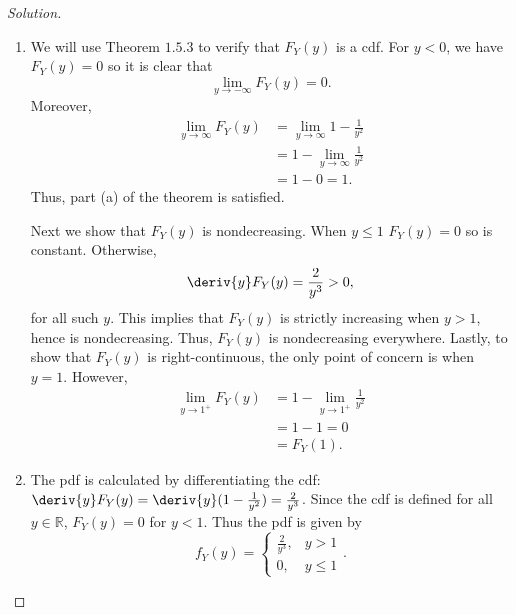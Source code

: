 \documentclass[12pt]{article}
\theoremstyle{definition}
\theoremstyle{plain}
\newenvironment{solution}
  {\begin{proof}[Solution]}
  {\end{proof}}
\begin{document}
\begin{enumerate}
\begin{solution}
\begin{enumerate}
\item We will use Theorem $ 1.5.3 $ to verify that $ F_Y(y) $ is a cdf. For $ y < 0 $, we have $ F_Y(y) = 0 $ so it is clear that 
\[ \lim_{y \to -\infty} F_Y(y) = 0. \]
Moreover, 
\begin{align*}
	\lim_{y \to \infty} F_Y(y) &= \lim_{y \to \infty} 1 - \frac{1}{y^2}\\
	&= 1 - \lim_{y \to \infty} \frac{1}{y^2}\\
	&= 1 - 0 = 1.
\end{align*}
Thus, part (a) of the theorem is satisfied. 

Next we show that $ F_Y(y) $ is nondecreasing. When $ y \leq 1 $ $ F_Y(y) = 0$ so is constant. Otherwise, 
\[ \deriv{y} F_Y(y) = \frac{2}{y^3} > 0, \]
for all such $ y $. This implies that $ F_Y(y) $ is strictly increasing when $ y > 1 $, hence is nondecreasing. Thus, $ F_Y(y) $ is nondecreasing everywhere. Lastly, to show that $ F_Y(y) $ is right-continuous, the only point of concern is when $ y = 1 $. However,
\begin{align*}
	\lim_{y \to 1^+} F_Y(y) &= 1 - \lim_{y \to 1^+}\frac{1}{y^2}\\
	&= 1 - 1 = 0\\
	&= F_Y(1).
\end{align*}

\item The pdf is calculated by differentiating the cdf: $\deriv{y} F_Y(y) = \deriv{y} (1 - \frac{1}{y^2}) = \frac{2}{y^3}$. Since the cdf is defined for all $ y \in \mathbb{R} $, $ F_Y(y) = 0 $ for $ y < 1 $. Thus the pdf is given by 
\[ f_Y(y) = 
\begin{cases}
	\frac{2}{y^3}, &y > 1\\
	0, & y \leq 1
\end{cases}. \] 


\end{enumerate}
\end{solution}
\end{enumerate}
\end{document}
